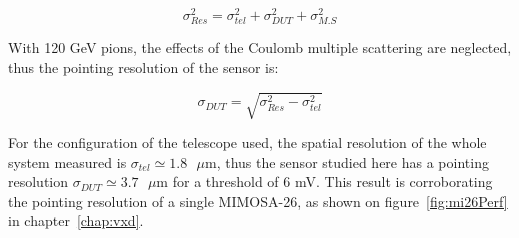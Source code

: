       \begin{equation}
        \sigma_{Res}^2 = \sigma_{tel}^2 + \sigma_{DUT}^2 + \sigma_{M.S}^2
        \label{eq:pointingResolution}
      \end{equation}

      With 120 GeV pions, the effects of the Coulomb multiple scattering are neglected, thus the pointing resolution of the sensor is:

      \begin{equation}
        \sigma_{DUT} = \sqrt{\sigma_{Res}^2 - \sigma_{tel}^2}
      \end{equation}

      For the configuration of the telescope used, the spatial resolution of the whole system measured is $\sigma_{tel} \simeq 1.8 \text{ }\mu\text{m}$, thus the sensor studied here has a pointing resolution $\sigma_{DUT} \simeq 3.7 \text{ }\mu\text{m}$ for a threshold of 6 mV.
      This result is corroborating the pointing resolution of a single MIMOSA-26, as shown on figure~\ref{fig:mi26Perf} in chapter~\ref{chap:vxd}.

